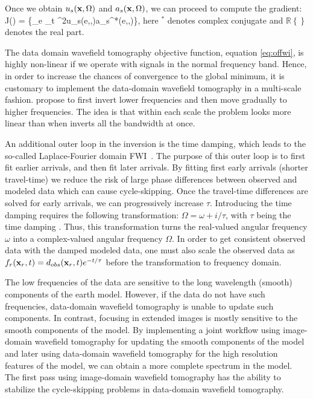 Once we obtain $u_s({\bf x},\Omega)$ and $a_s({\bf x},\Omega)$, we can proceed to compute the gradient:
\beq
\nabla J(\xx) = \left\{\sum_{e} \sum_t \Omega^2{u}_s({e},\xx,\Omega)a_s^*({e},\xx,\Omega)\right\},
\label{eq:graddwt}
\eeq
here $^*$ denotes complex conjugate and $\mathbb{R}\left\{\right\}$ denotes the real part.

The data domain wavefield tomography objective function, equation \ref{eq:offwi}, is highly non-linear if
we operate with signals in the normal frequency band. Hence, 
in order to increase the chances of convergence to the global minimum,
 it is customary to implement the data-domain wavefield tomography in a multi-scale fashion. \cite{Bunks95} propose to 
first invert lower frequencies and then 
move gradually to higher frequencies. The idea is that within each scale the problem looks more linear than
when inverts all the bandwidth at once. 

An additional outer loop in the inversion is the time damping, which leads to the
so-called Laplace-Fourier domain FWI~\citep{Sirgue,shin_cha}. The purpose of this outer loop is to first 
fit earlier arrivals, and then fit later arrivals. By fitting first early arrivals (shorter travel-time)
 we reduce the risk of large phase differences between observed and modeled data which 
can cause cycle-skipping. Once the travel-time differences are solved for early arrivals, we can progressively increase $\tau$.
Introducing the time damping requires the following transformation: $\Omega = \omega +i/\tau$, with $\tau$ being the 
time damping \citep{Kamei2013}. Thus, this transformation turns the real-valued 
angular frequency $\omega$ into a complex-valued angular frequency $\Omega$. In order to get consistent observed data
with the damped modeled data, one must also scale the observed data as ${f_r}({\bf x}_r,t)=d_{obs}({\bf x}_r,t)e^{-t/\tau}$ before
the transformation to frequency domain. 

The low frequencies of the data are sensitive to the long wavelength (smooth) components of the 
earth model. However, if the data do not have such frequencies, data-domain wavefield tomography is unable to update such components. 
 In contrast, focusing in extended images is mostly sensitive to the 
smooth components of the model. By implementing 
a joint workflow using image-domain wavefield tomography for updating the smooth components of the model and later using data-domain wavefield tomography for 
the high resolution features of the model, we can obtain a more complete spectrum in the model. The 
first pass using image-domain wavefield tomography has the ability to stabilize the cycle-skipping problems in data-domain wavefield tomography.








